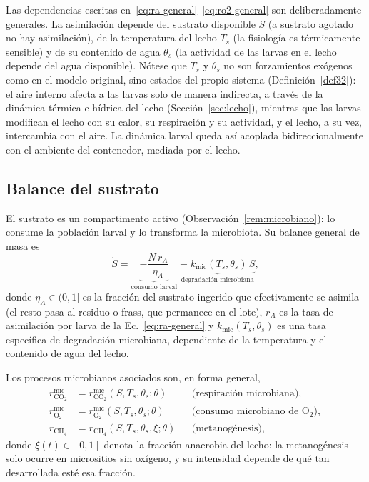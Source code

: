 \begin{remark}
\label{rem:dependencias}
Las dependencias escritas en~\eqref{eq:ra-general}--\eqref{eq:ro2-general} son deliberadamente generales. La asimilaci\'on depende del sustrato disponible $S$ (a sustrato agotado no hay asimilaci\'on), de la temperatura del lecho $T_s$ (la fisiolog\'ia es t\'ermicamente sensible) y de su contenido de agua $\theta_s$ (la actividad de las larvas en el lecho depende del agua disponible). N\'otese que $T_s$ y $\theta_s$ no son forzamientos ex\'ogenos como en el modelo original, sino estados del propio sistema (Definici\'on~\ref{def32}): el aire interno afecta a las larvas solo de manera indirecta, a trav\'es de la din\'amica t\'ermica e h\'idrica del lecho (Secci\'on~\ref{sec:lecho}), mientras que las larvas modifican el lecho con su calor, su respiraci\'on y su actividad, y el lecho, a su vez, intercambia con el aire. La din\'amica larval queda as\'i acoplada bidireccionalmente con el ambiente del contenedor, mediada por el lecho.
\end{remark}

\subsection{Balance del sustrato}
\label{sec:sustrato}

El sustrato es un compartimento activo (Observaci\'on~\ref{rem:microbiano}): lo consume la poblaci\'on larval y lo transforma la microbiota. Su balance general de masa es
\begin{equation}
\dot S = \underbrace{-\frac{N\,r_A}{\eta_A}}_{\text{consumo larval}} \;\underbrace{-\;k_{\mathrm{mic}}(T_s, \theta_s)\,S}_{\text{degradaci\'on microbiana}},
\label{eq:sustrato-general}
\end{equation}
donde $\eta_A \in (0,1]$ es la fracci\'on del sustrato ingerido que efectivamente se asimila (el resto pasa al residuo o frass, que permanece en el lote), $r_A$ es la tasa de asimilaci\'on por larva de la Ec.~\eqref{eq:ra-general} y $k_{\mathrm{mic}}(T_s, \theta_s)$ es una tasa espec\'ifica de degradaci\'on microbiana, dependiente de la temperatura y el contenido de agua del lecho.

Los procesos microbianos asociados son, en forma general,
\begin{align}
r^{\mathrm{mic}}_{\mathrm{CO_2}} &= r^{\mathrm{mic}}_{\mathrm{CO_2}}(S, T_s, \theta_s; \theta) && \text{(respiraci\'on microbiana)}, \label{eq:co2mic}\\
r^{\mathrm{mic}}_{\mathrm{O_2}} &= r^{\mathrm{mic}}_{\mathrm{O_2}}(S, T_s, \theta_s; \theta) && \text{(consumo microbiano de O$_2$)}, \label{eq:o2mic}\\
r_{\mathrm{CH_4}} &= r_{\mathrm{CH_4}}(S, T_s, \theta_s, \xi; \theta) && \text{(metanog\'enesis)}, \label{eq:ch4-general}
\end{align}
donde $\xi(t) \in [0,1]$ denota la fracci\'on anaerobia del lecho: la metanog\'enesis solo ocurre en micrositios sin ox\'igeno, y su intensidad depende de qu\'e tan desarrollada est\'e esa fracci\'on.

